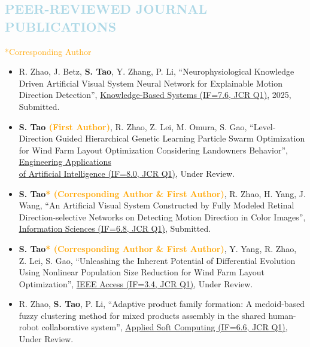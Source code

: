 \documentclass[11pt,a4paper,sans]{moderncv}
\renewcommand{\underline}[1]{\uline{#1}}
\begin{document}
\subsection{\textcolor{lightblue}{PEER-REVIEWED JOURNAL PUBLICATIONS}}
\textcolor{orange}{*Corresponding Author}
{\begin{itemize}[label=\textbullet]

      \item [36)] R. Zhao, J. Betz, \textbf{S. Tao}, Y. Zhang, P. Li, “Neurophysiological Knowledge Driven Artificial Visual System Neural Network for Explainable Motion Direction Detection”, \color{black}\href{https://www.sciencedirect.com/journal/knowledge-based-systems}{\underline{Knowledge-Based Systems (IF=7.6, JCR Q1)}}, 2025, Submitted.
      
      \item [35)] \textbf{S. Tao \textcolor{orange}{(First Author)}}, R. Zhao, Z. Lei, M. Omura, S. Gao, “Level-Direction Guided Hierarchical Genetic Learning Particle Swarm Optimization for Wind Farm Layout Optimization Considering Landowners Behavior”, \color{black} \href{https://www.sciencedirect.com/journal/engineering-applications-of-artificial-intelligence}{\underline{Engineering Applications }\\\underline{of Artificial Intelligence (IF=8.0, JCR Q1)}}, Under Review.
      
      \item [34)] \textbf{S. Tao\textcolor{orange}{* (Corresponding Author \& First Author)}}, R. Zhao, H. Yang, J. Wang, “An Artificial Visual System Constructed by Fully Modeled Retinal Direction-selective Networks on Detecting Motion Direction in Color Images”, \color{black}\href{https://www.sciencedirect.com/journal/information-sciences}{\underline{Information Sciences (IF=6.8, JCR Q1)}}, Submitted.
      
      \item [33)] \textbf{S. Tao\textcolor{orange}{* (Corresponding Author \& First Author)}}, Y. Yang, R. Zhao, Z. Lei, S. Gao, “Unleashing the Inherent Potential of Differential Evolution Using Nonlinear Population Size Reduction for Wind Farm Layout Optimization”, \color{black}\href{https://ieeeaccess.ieee.org/}{\underline{IEEE Access (IF=3.4, JCR Q1)}}, Under Review.
      
      \item [32)] R. Zhao, \textbf{S. Tao}, P. Li, “Adaptive product family formation: A medoid-based fuzzy clustering method for mixed products assembly in the shared human-robot collaborative system”, \href{https://www.sciencedirect.com/journal/applied-soft-computing}{\underline{Applied Soft Computing (IF=6.6, JCR Q1)}}, Under Review.


\end{itemize}}
\end{document}
